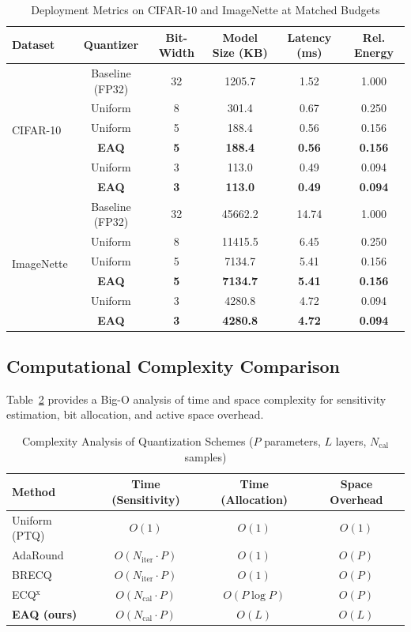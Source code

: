 \documentclass[11pt,a4paper]{article}
\begin{document}
\begin{table}[h]
\caption{Deployment Metrics on CIFAR-10 and ImageNette at Matched Budgets}
\label{tab:deployment}
\centering
\small
\begin{tabular}{lccccc}
\toprule
\textbf{Dataset} & \textbf{Quantizer} & \textbf{Bit-Width} & \textbf{Model Size (KB)} & \textbf{Latency (ms)} & \textbf{Rel. Energy} \\
\midrule
\multirow{6}{*}{CIFAR-10} & Baseline (FP32) & 32 & 1205.7 & 1.52 & 1.000 \\
 & Uniform & 8 & 301.4 & 0.67 & 0.250 \\
 & Uniform & 5 & 188.4 & 0.56 & 0.156 \\
 & \textbf{EAQ} & \textbf{5} & \textbf{188.4} & \textbf{0.56} & \textbf{0.156} \\
 & Uniform & 3 & 113.0 & 0.49 & 0.094 \\
 & \textbf{EAQ} & \textbf{3} & \textbf{113.0} & \textbf{0.49} & \textbf{0.094} \\
\midrule
\multirow{6}{*}{ImageNette} & Baseline (FP32) & 32 & 45662.2 & 14.74 & 1.000 \\
 & Uniform & 8 & 11415.5 & 6.45 & 0.250 \\
 & Uniform & 5 & 7134.7 & 5.41 & 0.156 \\
 & \textbf{EAQ} & \textbf{5} & \textbf{7134.7} & \textbf{5.41} & \textbf{0.156} \\
 & Uniform & 3 & 4280.8 & 4.72 & 0.094 \\
 & \textbf{EAQ} & \textbf{3} & \textbf{4280.8} & \textbf{4.72} & \textbf{0.094} \\
\bottomrule
\end{tabular}
\end{table}

\subsection{Computational Complexity Comparison}
Table~\ref{tab:complexity} provides a Big-O analysis of time and space complexity for sensitivity estimation, bit allocation, and active space overhead.

\begin{table}[h]
\caption{Complexity Analysis of Quantization Schemes ($P$ parameters, $L$ layers, $N_{\mathrm{cal}}$ samples)}
\label{tab:complexity}
\centering
\small
\begin{tabular}{lccc}
\toprule
\textbf{Method} & \textbf{Time (Sensitivity)} & \textbf{Time (Allocation)} & \textbf{Space Overhead} \\
\midrule
Uniform (PTQ) & $O(1)$ & $O(1)$ & $O(1)$ \\
AdaRound & $O(N_{\mathrm{iter}} \cdot P)$ & $O(1)$ & $O(P)$ \\
BRECQ & $O(N_{\mathrm{iter}} \cdot P)$ & $O(1)$ & $O(P)$ \\
ECQ$^{\mathrm{x}}$ & $O(N_{\mathrm{cal}} \cdot P)$ & $O(P \log P)$ & $O(P)$ \\
\textbf{EAQ (ours)} & $O(N_{\mathrm{cal}} \cdot P)$ & $O(L)$ & $O(L)$ \\
\bottomrule
\end{tabular}
\end{table}
\end{document}

